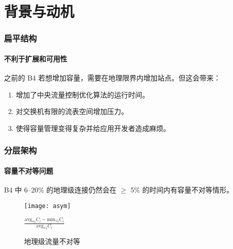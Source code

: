     \section{背景与动机}

    \begin{frame}
        \frametitle{扁平结构}
        \framesubtitle{不利于扩展和可用性}
        之前的 B4 若想增加容量，需要在地理限界内增加站点。但这会带来：
        \begin{enumerate}
            \item 增加了中央流量控制优化算法的运行时间。
            \item 对交换机有限的流表空间增加压力。
            \item 使得容量管理变得复杂并给应用开发者造成麻烦。
        \end{enumerate}
    \end{frame}

    \begin{frame}
        \frametitle{分层架构}
        \framesubtitle{容量不对等问题}
        B4 中 6--20\% 的地理级连接仍然会在 $\geq$ 5\% 的时间内有容量不对等情形。
        \begin{figure}[H]
            \centering
            \texttt{[image: asym]}

            $\frac{\text{avg}_{\forall i} C_i - \text{min}_{\forall i} C_i}{\text{avg}_{\forall i} C_i}$
            \caption{地理级流量不对等}\label{fig:asym}
        \end{figure}
    \end{frame}

